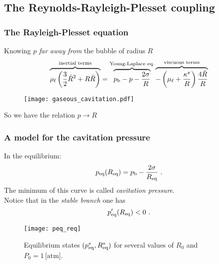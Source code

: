 \documentclass[10pt,aspectratio=169]{beamer}
\begin{document}
\subsection{The Reynolds-Rayleigh-Plesset coupling}

\begin{frame}
\frametitle{The Rayleigh-Plesset equation}
\vspace*{1.0cm}
\hspace*{-0.5cm}
\begin{minipage}{0.4\textwidth}
Knowing $p$ \emph{far away from} the bubble of radius $R$
\begin{equation*}
\overbrace{\rho_\ell\left(\frac{3}{2}\dot{R}^2+R\ddot{R}\right)}^{\text{inertial terms}}=\overbrace{p_\textnormal{b}-p-\frac{2\sigma}{R}}^{\text{Young-Laplace eq.}}\overbrace{-\left(\mu_\ell+\frac{\kappa^s}{R}\right)\frac{4\dot{R}}{R}}^{\text{viscuous terms}}
\end{equation*}
\end{minipage}%
\hspace*{0.8cm}
\begin{minipage}{0.5\textwidth}
\begin{figure}[h]
	\texttt{[image: gaseous\_cavitation.pdf]}
\end{figure}
\end{minipage}
\begin{center}
So we have the relation $p\longrightarrow R$
\end{center}
\end{frame}

\begin{frame}
\frametitle{A model for the cavitation pressure}
\begin{minipage}{0.3\textwidth}
In the equilibrium:
$$p_{\textnormal{{eq}}}(R_{\textnormal{{eq}}})=p_\textnormal{b}-\frac{2\sigma}{R_{\textnormal{{eq}}}}~.$$
The minimum of this curve is called \emph{cavitation pressure}.\\

Notice that in the \emph{stable branch} one has $$p_{\textnormal{{eq}}}'(R_{\textnormal{{eq}}})<0~.$$
\end{minipage}%
\hspace*{0.5cm}
\begin{minipage}{0.5\textwidth}\vspace*{1.0cm}
	\begin{figure}
	\texttt{[image: peq\_req]}
	\caption{Equilibrium states $(p_{\textnormal{{eq}}}^*,R_{\textnormal{{eq}}}^*)$ for several values of $R_0$ and $P_0=1\,\mbox{[atm]}$.}
\end{figure}
\end{minipage}
\end{frame}
\end{document}
